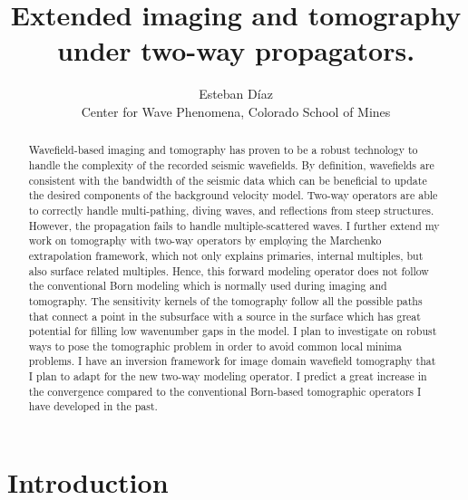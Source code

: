 

\newcommand*{\mytext}[2]{%
\noindent\color{#1!80}{%
\parbox{0.98\linewidth}{#2}}}%


\author{\textup{Esteban D\'{i}az}\\
Center for Wave Phenomena,  
Colorado School of Mines}

\title{Extended imaging and tomography under two-way propagators.}

\maketitle

\newif\ifreport
\reporttrue



\begin{abstract}
Wavefield-based imaging and tomography has proven to be a robust technology
to handle the complexity of the recorded seismic wavefields. 
 By definition, wavefields are consistent with the bandwidth of the seismic data which
can be beneficial to update the desired components of the background velocity
model. Two-way operators are able to correctly handle multi-pathing,
 diving waves, and reflections from steep structures. However, the propagation
fails to handle multiple-scattered waves. I further extend my work on tomography with two-way operators
 by employing the Marchenko extrapolation framework, which not only explains primaries, internal
multiples, but also surface related multiples. Hence, this forward
modeling operator does not follow the conventional Born modeling which is normally used
during imaging and tomography. The sensitivity kernels of the tomography
follow all the possible paths that connect a point in the subsurface with 
a source in the surface which has great potential for filling low 
wavenumber gaps in the model. I plan to investigate on 
robust ways to pose the tomographic problem in order to avoid common 
local minima problems. I have an inversion framework for image domain
wavefield tomography that I plan to adapt for the new two-way modeling 
operator. I predict a great increase in the convergence compared to 
the conventional Born-based tomographic operators I have developed in the 
past.
\end{abstract}

\section{Introduction}
% 
%
%

